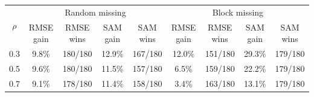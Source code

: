 \begin{tabular}{@{}c c c c c c c c c@{}}
\toprule
\multirow{2}{*}{$\rho$} &
\multicolumn{4}{c}{Random missing} &
\multicolumn{4}{c}{Block missing} \\
\cmidrule(lr){2-5}\cmidrule(l){6-9}
& RMSE gain & RMSE wins & SAM gain & SAM wins
& RMSE gain & RMSE wins & SAM gain & SAM wins \\
\midrule
0.3 & 9.8\% & 180/180 & 12.9\% & 167/180 & 12.0\% & 151/180 & 29.3\% & 179/180 \\
0.5 & 9.6\% & 180/180 & 11.5\% & 157/180 & 6.5\% & 159/180 & 22.2\% & 179/180 \\
0.7 & 9.1\% & 178/180 & 11.4\% & 158/180 & 3.4\% & 163/180 & 13.1\% & 179/180 \\
\bottomrule
\end{tabular}
